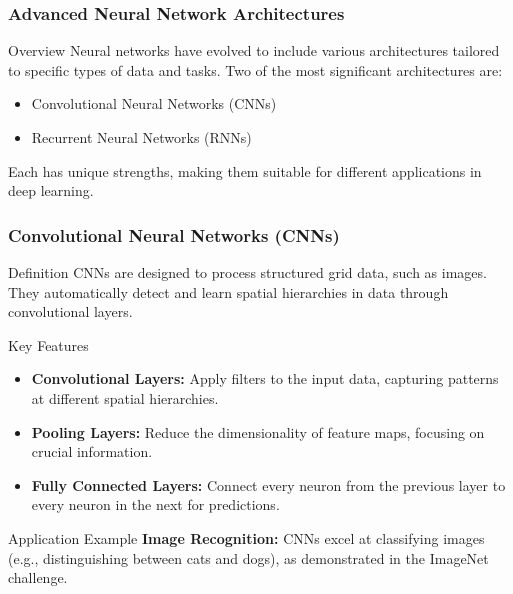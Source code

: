 \documentclass[aspectratio=169]{beamer}
\begin{document}
\begin{frame}[fragile]
    \frametitle{Advanced Neural Network Architectures}
    \begin{block}{Overview}
        Neural networks have evolved to include various architectures tailored to specific types of data and tasks. Two of the most significant architectures are:
        \begin{itemize}
            \item Convolutional Neural Networks (CNNs)
            \item Recurrent Neural Networks (RNNs)
        \end{itemize}
        Each has unique strengths, making them suitable for different applications in deep learning.
    \end{block}
\end{frame}

\begin{frame}[fragile]
    \frametitle{Convolutional Neural Networks (CNNs)}
    \begin{block}{Definition}
        CNNs are designed to process structured grid data, such as images. They automatically detect and learn spatial hierarchies in data through convolutional layers.
    \end{block}
    
    \begin{block}{Key Features}
        \begin{itemize}
            \item \textbf{Convolutional Layers:} Apply filters to the input data, capturing patterns at different spatial hierarchies.
            \item \textbf{Pooling Layers:} Reduce the dimensionality of feature maps, focusing on crucial information.
            \item \textbf{Fully Connected Layers:} Connect every neuron from the previous layer to every neuron in the next for predictions.
        \end{itemize}
    \end{block}
    
    \begin{block}{Application Example}
        \textbf{Image Recognition:} CNNs excel at classifying images (e.g., distinguishing between cats and dogs), as demonstrated in the ImageNet challenge.
    \end{block}
\end{frame}
\end{document}

